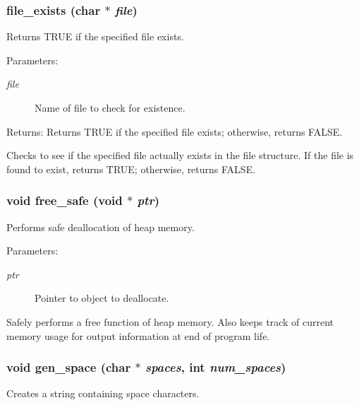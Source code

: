\subsubsection{ file\_\-exists (char $\ast$ {\em file})}\label{util_8h_a7}


Returns TRUE if the specified file exists.

\begin{Desc}
\item[Parameters:]
\begin{description}
\item[{\em file}]Name of file to check for existence. \end{description}
\end{Desc}
\begin{Desc}
\item[Returns:]Returns TRUE if the specified file exists; otherwise, returns FALSE.\end{Desc}
Checks to see if the specified file actually exists in the file structure. If the file is found to exist, returns TRUE; otherwise, returns FALSE. 
\subsubsection{\setlength{\rightskip}{0pt plus 5cm}void free\_\-safe (void $\ast$ {\em ptr})}\label{util_8h_a14}


Performs safe deallocation of heap memory.

\begin{Desc}
\item[Parameters:]
\begin{description}
\item[{\em ptr}]Pointer to object to deallocate.\end{description}
\end{Desc}
Safely performs a free function of heap memory. Also keeps track of current memory usage for output information at end of program life. 
\subsubsection{\setlength{\rightskip}{0pt plus 5cm}void gen\_\-space (char $\ast$ {\em spaces}, int {\em num\_\-spaces})}\label{util_8h_a15}


Creates a string containing space characters.

